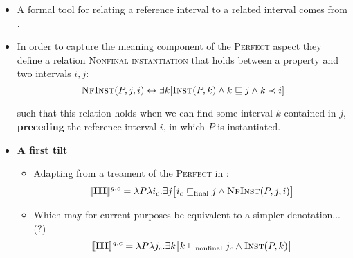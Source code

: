 \documentclass[11pt,dvipsnames]{article}
\begin{document}
\begin{itemize}
	\item  A formal tool for relating a reference interval to a related interval comes from \citet{Condoravdi2014}.
	\item  In order to capture the meaning component of the \textsc{Perfect} aspect they define a relation \textsc{Nonfinal instantiation} that holds between a property and two intervals $i,j$:
	$$\textsc{NfInst}(P,j,i)\leftrightarrow\exists k [\textsc{Inst}(P,k)\wedge k\sqsubseteq j\wedge k\prec i]$$
	
	such that this relation holds when we can find some interval $k$ contained in $j$, \textbf{preceding} the reference interval $i$, in which $P$ is instantiated.
	
	\item \textbf{A first tilt}
	\begin{itemize}
		
		
		\item Adapting from a treament of the \textsc{Perfect} in \citet{Condoravdi2014}:
		$$\llbracket\textbf{III}\rrbracket^{g,c}=\lambda P\lambda i_c.\exists j\big[i_c\sqsubseteq_{\text{final}}j\wedge\textsc{NfInst}(P,j,i)\big]$$
		
		\item  Which may for current purposes be equivalent to a simpler denotation...(?)
		$$\llbracket\textbf{III}\rrbracket^{g,c}=\lambda P\lambda j_c.\exists k\big[k\sqsubseteq_{\text{nonfinal}}j_c\wedge\textsc{Inst}(P,k)\big]$$
		
	\end{itemize}


\begin{figure}[H]
	\centering
\end{figure}
\end{itemize}
\end{document}
